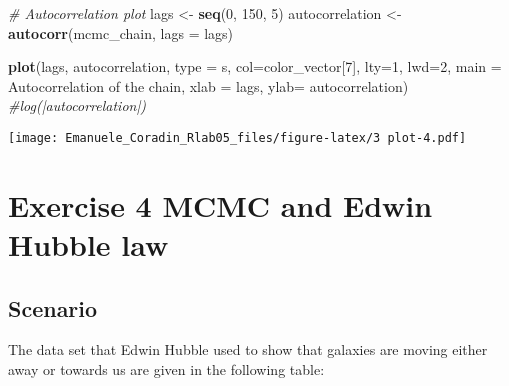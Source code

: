 \documentclass[
]{article}
\newenvironment{Shaded}{\begin{snugshade}}{\end{snugshade}}
\newcommand{\AttributeTok}[1]{\textcolor[rgb]{0.13,0.29,0.53}{#1}}
\newcommand{\CommentTok}[1]{\textcolor[rgb]{0.56,0.35,0.01}{\textit{#1}}}
\newcommand{\DecValTok}[1]{\textcolor[rgb]{0.00,0.00,0.81}{#1}}
\newcommand{\FunctionTok}[1]{\textcolor[rgb]{0.13,0.29,0.53}{\textbf{#1}}}
\newcommand{\NormalTok}[1]{#1}
\newcommand{\OtherTok}[1]{\textcolor[rgb]{0.56,0.35,0.01}{#1}}
\newcommand{\StringTok}[1]{\textcolor[rgb]{0.31,0.60,0.02}{#1}}
\begin{document}
\begin{Shaded}
\begin{Highlighting}[]
\CommentTok{\# Autocorrelation plot}
\NormalTok{lags }\OtherTok{\textless{}{-}} \FunctionTok{seq}\NormalTok{(}\DecValTok{0}\NormalTok{, }\DecValTok{150}\NormalTok{, }\DecValTok{5}\NormalTok{)}
\NormalTok{autocorrelation }\OtherTok{\textless{}{-}} \FunctionTok{autocorr}\NormalTok{(mcmc\_chain, }\AttributeTok{lags =}\NormalTok{ lags)}

\FunctionTok{plot}\NormalTok{(lags, autocorrelation, }\AttributeTok{type =} \StringTok{\textquotesingle{}s\textquotesingle{}}\NormalTok{, }\AttributeTok{col=}\NormalTok{color\_vector[}\DecValTok{7}\NormalTok{], }\AttributeTok{lty=}\DecValTok{1}\NormalTok{, }\AttributeTok{lwd=}\DecValTok{2}\NormalTok{, }\AttributeTok{main =} \StringTok{\textquotesingle{}Autocorrelation of the chain\textquotesingle{}}\NormalTok{, }\AttributeTok{xlab =} \StringTok{\textquotesingle{}lags\textquotesingle{}}\NormalTok{, }\AttributeTok{ylab=} \StringTok{\textquotesingle{}autocorrelation\textquotesingle{}}\NormalTok{) }\CommentTok{\#\textquotesingle{}log(|autocorrelation|)\textquotesingle{}}
\end{Highlighting}
\end{Shaded}

\texttt{[image: Emanuele\_Coradin\_Rlab05\_files/figure-latex/3 plot-4.pdf]}

\hypertarget{exercise-4-mcmc-and-edwin-hubble-law}{%
\section{Exercise 4 MCMC and Edwin Hubble
law}\label{exercise-4-mcmc-and-edwin-hubble-law}}

\hypertarget{scenario-3}{%
\subsection{Scenario}\label{scenario-3}}

The data set that Edwin Hubble used to show that galaxies are moving
either away or towards us are given in the following table:
\end{document}
